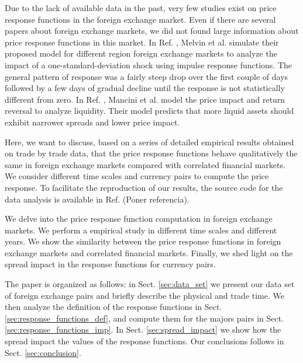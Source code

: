 Due to the lack of available data in the past, very few studies exist on price
response functions in the foreign exchange market. Even if there are several
papers about foreign exchange markets, we did not found large information about
price response functions in this market. In Ref. \cite{forex_volatility},
Melvin et al. simulate their proposed model for different region foreign
exchange markets to analyze the impact of a one-standard-deviation shock using
impulse response functions. The general pattern of response was a fairly steep
drop over the first couple of days followed by a few days of gradual decline
until the response is not statistically different from zero. In Ref.
\cite{forex_liquidity}, Mancini et al. model the price impact and return
reversal to analyze liquidity. Their model predicts that more liquid assets
should exhibit narrower spreads and lower price impact.

Here, we want to discuss, based on a series of detailed empirical results
obtained on trade by trade data, that the price response functions behave
qualitatively the same in foreign exchange markets compared with correlated
financial markets. We consider different time scales and currency pairs to
compute the price response. To facilitate the reproduction of our results, the
source code for the data analysis is available in Ref. (Poner referencia).

We delve into the price response function computation in foreign exchange
markets. We perform a empirical study in different time scales and different
years. We show the similarity between the price response functions in foreign
exchange markets and correlated financial markets. Finally, we shed light on
the spread impact in the response functions for currency pairs.

The paper is organized as follows: in Sect. \ref{sec:data_set} we present our
data set of foreign exchange pairs and briefly describe the physical and trade
time. We then analyze the definition of the response functions in Sect.
\ref{sec:response_functions_def}, and compute them for the majors pairs in
Sect. \ref{sec:response_functions_imp}. In Sect. \ref{sec:spread_impact} we
show how the spread impact the values of the response functions. Our
conclusions follows in Sect. \ref{sec:conclusion}.